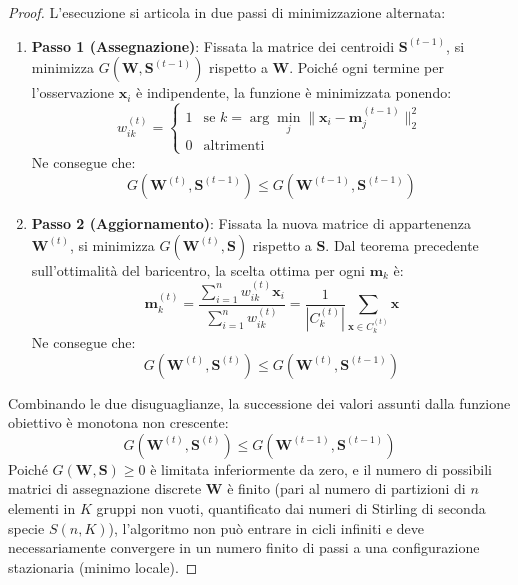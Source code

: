 \begin{proof}
L'esecuzione si articola in due passi di minimizzazione alternata:
\begin{enumerate}
    \item \textbf{Passo 1 (Assegnazione)}: Fissata la matrice dei centroidi $\mathbf{S}^{(t-1)}$, si minimizza $G(\mathbf{W}, \mathbf{S}^{(t-1)})$ rispetto a $\mathbf{W}$. Poiché ogni termine per l'osservazione $\mathbf{x}_i$ è indipendente, la funzione è minimizzata ponendo:
    \begin{equation}
        w_{ik}^{(t)} = \begin{cases}
            1 & \text{se } k = \arg\min_{j} \|\mathbf{x}_i - \mathbf{m}_j^{(t-1)}\|_2^2 \\
            0 & \text{altrimenti}
        \end{cases}
    \end{equation}
    Ne consegue che:
    \begin{equation}
        G(\mathbf{W}^{(t)}, \mathbf{S}^{(t-1)}) \le G(\mathbf{W}^{(t-1)}, \mathbf{S}^{(t-1)})
    \end{equation}
    \item \textbf{Passo 2 (Aggiornamento)}: Fissata la nuova matrice di appartenenza $\mathbf{W}^{(t)}$, si minimizza $G(\mathbf{W}^{(t)}, \mathbf{S})$ rispetto a $\mathbf{S}$. Dal teorema precedente sull'ottimalità del baricentro, la scelta ottima per ogni $\mathbf{m}_k$ è:
    \begin{equation}
        \mathbf{m}_k^{(t)} = \frac{\sum_{i=1}^n w_{ik}^{(t)} \mathbf{x}_i}{\sum_{i=1}^n w_{ik}^{(t)}} = \frac{1}{|C_k^{(t)}|} \sum_{\mathbf{x} \in C_k^{(t)}} \mathbf{x}
    \end{equation}
    Ne consegue che:
    \begin{equation}
        G(\mathbf{W}^{(t)}, \mathbf{S}^{(t)}) \le G(\mathbf{W}^{(t)}, \mathbf{S}^{(t-1)})
    \end{equation}
\end{enumerate}
Combinando le due disuguaglianze, la successione dei valori assunti dalla funzione obiettivo è monotona non crescente:
\begin{equation}
    G(\mathbf{W}^{(t)}, \mathbf{S}^{(t)}) \le G(\mathbf{W}^{(t-1)}, \mathbf{S}^{(t-1)})
\end{equation}
Poiché $G(\mathbf{W}, \mathbf{S}) \ge 0$ è limitata inferiormente da zero, e il numero di possibili matrici di assegnazione discrete $\mathbf{W}$ è finito (pari al numero di partizioni di $n$ elementi in $K$ gruppi non vuoti, quantificato dai numeri di Stirling di seconda specie $S(n, K)$), l'algoritmo non può entrare in cicli infiniti e deve necessariamente convergere in un numero finito di passi a una configurazione stazionaria (minimo locale).
\end{proof}

